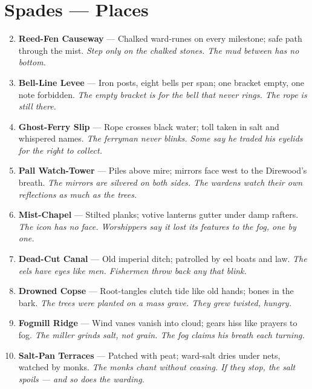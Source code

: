 \section*{Spades --- Places}
\label{sec:mistlands-places}
\begin{enumerate}
\setcounter{enumi}{1}
\item \textbf{Reed-Fen Causeway} --- Chalked ward-runes on every milestone; safe path through the mist. 
  \hfill \textit{Step only on the chalked stones. The mud between has no bottom.}
\item \textbf{Bell-Line Levee} --- Iron posts, eight bells per span; one bracket empty, one note forbidden. 
  \hfill \textit{The empty bracket is for the bell that never rings. The rope is still there.}
\item \textbf{Ghost-Ferry Slip} --- Rope crosses black water; toll taken in salt and whispered names.  
  \hfill \textit{The ferryman never blinks. Some say he traded his eyelids for the right to collect.}
\item \textbf{Pall Watch-Tower} --- Piles above mire; mirrors face west to the Direwood's breath. 
  \hfill \textit{The mirrors are silvered on both sides. The wardens watch their own reflections as much as the trees.}
\item \textbf{Mist-Chapel} --- Stilted planks; votive lanterns gutter under damp rafters. 
  \hfill \textit{The icon has no face. Worshippers say it lost its features to the fog, one by one.}
\item \textbf{Dead-Cut Canal} --- Old imperial ditch; patrolled by eel boats and law. 
  \hfill \textit{The eels have eyes like men. Fishermen throw back any that blink.}
\item \textbf{Drowned Copse} --- Root-tangles clutch tide like old hands; bones in the bark. 
  \hfill \textit{The trees were planted on a mass grave. They grew twisted, hungry.}
\item \textbf{Fogmill Ridge} --- Wind vanes vanish into cloud; gears hiss like prayers to fog. 
  \hfill \textit{The miller grinds salt, not grain. The fog claims his breath each turning.}
\item \textbf{Salt-Pan Terraces} --- Patched with peat; ward-salt dries under nets, watched by monks. 
  \hfill \textit{The monks chant without ceasing. If they stop, the salt spoils --- and so does the warding.}

\end{enumerate}
